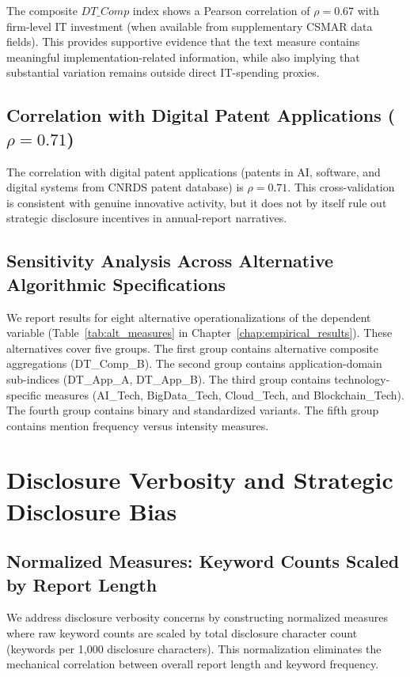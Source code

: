 The composite $DT\_Comp$ index shows a Pearson correlation of $\rho = 0.67$ with firm-level IT investment (when available from supplementary CSMAR data fields). This provides supportive evidence that the text measure contains meaningful implementation-related information, while also implying that substantial variation remains outside direct IT-spending proxies.

\subsection{\texorpdfstring{Correlation with Digital Patent Applications ($\rho = 0.71$)}{Correlation with Digital Patent Applications (rho = 0.71)}}

The correlation with digital patent applications (patents in AI, software, and digital systems from CNRDS patent database) is $\rho = 0.71$. This cross-validation is consistent with genuine innovative activity, but it does not by itself rule out strategic disclosure incentives in annual-report narratives.

\subsection{Sensitivity Analysis Across Alternative Algorithmic Specifications}

We report results for eight alternative operationalizations of the dependent variable (Table~\ref{tab:alt_measures} in Chapter~\ref{chap:empirical_results}). These alternatives cover five groups. The first group contains alternative composite aggregations (DT\_Comp\_B). The second group contains application-domain sub-indices (DT\_App\_A, DT\_App\_B). The third group contains technology-specific measures (AI\_Tech, BigData\_Tech, Cloud\_Tech, and Blockchain\_Tech). The fourth group contains binary and standardized variants. The fifth group contains mention frequency versus intensity measures.

\section{Disclosure Verbosity and Strategic Disclosure Bias}

\subsection{Normalized Measures: Keyword Counts Scaled by Report Length}

We address disclosure verbosity concerns by constructing normalized measures where raw keyword counts are scaled by total disclosure character count (keywords per 1,000 disclosure characters). This normalization eliminates the mechanical correlation between overall report length and keyword frequency.

